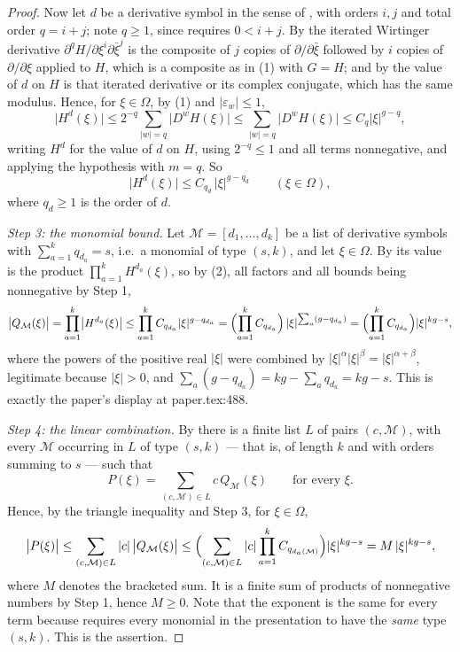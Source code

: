 \begin{proof}
Now let $d$ be a derivative symbol in the sense of , with
orders $i,j$ and total order $q=i+j$; note $q\ge1$, since
 requires $0<i+j$.  By  the
iterated Wirtinger derivative $\partial^{q}H/\partial\xi^{i}\partial\bar\xi^{j}$
is the composite of $j$ copies of $\partial/\partial\bar\xi$ followed by $i$
copies of $\partial/\partial\xi$ applied to $H$, which is a composite as in
(1) with $G=H$; and by  the value of $d$ on $H$ is that
iterated derivative or its complex conjugate, which has the same modulus.
Hence, for $\xi\in\Omega$, by (1) and $|\varepsilon_w|\le1$,
\[
  \bigl|H^{d}(\xi)\bigr|
  \le2^{-q}\sum_{|w|=q}\bigl|D^{w}H(\xi)\bigr|
  \le\sum_{|w|=q}\bigl|D^{w}H(\xi)\bigr|
  \le C_q|\xi|^{g-q},
\]
writing $H^{d}$ for the value of $d$ on $H$, using $2^{-q}\le1$ and all terms
nonnegative, and applying the hypothesis with $m=q$.  So
\begin{equation}\tag{2}
  \bigl|H^{d}(\xi)\bigr|\le C_{q_d}\,|\xi|^{g-q_d}\qquad(\xi\in\Omega),
\end{equation}
where $q_d\ge1$ is the order of $d$.

\emph{Step 3: the monomial bound.}  Let $\mathcal{M}=[d_1,\dots,d_k]$ be a list
of derivative symbols with $\sum_{a=1}^{k}q_{d_a}=s$, i.e.\ a monomial of type
$(s,k)$, and let $\xi\in\Omega$.  By  its value is the
product $\prod_{a=1}^{k}H^{d_a}(\xi)$, so by (2), all factors and all bounds
being nonnegative by Step 1,
\[
  \bigl|Q_{\mathcal{M}}(\xi)\bigr|
  =\prod_{a=1}^{k}\bigl|H^{d_a}(\xi)\bigr|
  \le\prod_{a=1}^{k}C_{q_{d_a}}|\xi|^{g-q_{d_a}}
  =\Bigl(\prod_{a=1}^{k}C_{q_{d_a}}\Bigr)\,|\xi|^{\sum_{a}(g-q_{d_a})}
  =\Bigl(\prod_{a=1}^{k}C_{q_{d_a}}\Bigr)|\xi|^{kg-s},
\]
where the powers of the positive real $|\xi|$ were combined by
$|\xi|^{\alpha}|\xi|^{\beta}=|\xi|^{\alpha+\beta}$, legitimate because
$|\xi|>0$, and $\sum_{a}(g-q_{d_a})=kg-\sum_aq_{d_a}=kg-s$.  This is exactly
the paper's display at paper.tex:488.

\emph{Step 4: the linear combination.}  By  there is a finite
list $L$ of pairs $(c,\mathcal{M})$, with every $\mathcal{M}$ occurring in $L$
of type $(s,k)$ --- that is, of length $k$ and with orders summing to $s$ ---
such that
\[
  P(\xi)=\sum_{(c,\mathcal{M})\in L}c\,Q_{\mathcal{M}}(\xi)
  \qquad\text{for every }\xi .
\]
Hence, by the triangle inequality and Step 3, for $\xi\in\Omega$,
\[
  \bigl|P(\xi)\bigr|
  \le\sum_{(c,\mathcal{M})\in L}|c|\,\bigl|Q_{\mathcal{M}}(\xi)\bigr|
  \le\Bigl(\sum_{(c,\mathcal{M})\in L}|c|\prod_{a=1}^{k}C_{q_{d_a(\mathcal{M})}}\Bigr)
    |\xi|^{kg-s}
  =M\,|\xi|^{kg-s},
\]
where $M$ denotes the bracketed sum.  It is a finite sum of products of
nonnegative numbers by Step 1, hence $M\ge0$.  Note that the exponent is the
same for every term because  requires every monomial in the
presentation to have the \emph{same} type $(s,k)$.  This is the assertion.
\end{proof}

